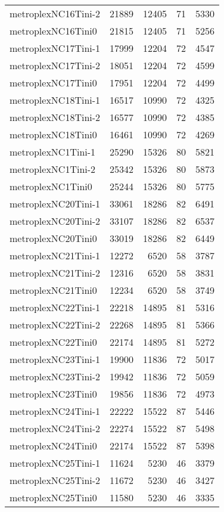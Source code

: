 \begin{longtable}{lrrrr}
metroplexNC16Tini-2 & 21889 & 12405 & 71 & 5330 \\
metroplexNC16Tini0 & 21815 & 12405 & 71 & 5256 \\
metroplexNC17Tini-1 & 17999 & 12204 & 72 & 4547 \\
metroplexNC17Tini-2 & 18051 & 12204 & 72 & 4599 \\
metroplexNC17Tini0 & 17951 & 12204 & 72 & 4499 \\
metroplexNC18Tini-1 & 16517 & 10990 & 72 & 4325 \\
metroplexNC18Tini-2 & 16577 & 10990 & 72 & 4385 \\
metroplexNC18Tini0 & 16461 & 10990 & 72 & 4269 \\
metroplexNC1Tini-1 & 25290 & 15326 & 80 & 5821 \\
metroplexNC1Tini-2 & 25342 & 15326 & 80 & 5873 \\
metroplexNC1Tini0 & 25244 & 15326 & 80 & 5775 \\
metroplexNC20Tini-1 & 33061 & 18286 & 82 & 6491 \\
metroplexNC20Tini-2 & 33107 & 18286 & 82 & 6537 \\
metroplexNC20Tini0 & 33019 & 18286 & 82 & 6449 \\
metroplexNC21Tini-1 & 12272 & 6520 & 58 & 3787 \\
metroplexNC21Tini-2 & 12316 & 6520 & 58 & 3831 \\
metroplexNC21Tini0 & 12234 & 6520 & 58 & 3749 \\
metroplexNC22Tini-1 & 22218 & 14895 & 81 & 5316 \\
metroplexNC22Tini-2 & 22268 & 14895 & 81 & 5366 \\
metroplexNC22Tini0 & 22174 & 14895 & 81 & 5272 \\
metroplexNC23Tini-1 & 19900 & 11836 & 72 & 5017 \\
metroplexNC23Tini-2 & 19942 & 11836 & 72 & 5059 \\
metroplexNC23Tini0 & 19856 & 11836 & 72 & 4973 \\
metroplexNC24Tini-1 & 22222 & 15522 & 87 & 5446 \\
metroplexNC24Tini-2 & 22274 & 15522 & 87 & 5498 \\
metroplexNC24Tini0 & 22174 & 15522 & 87 & 5398 \\
metroplexNC25Tini-1 & 11624 & 5230 & 46 & 3379 \\
metroplexNC25Tini-2 & 11672 & 5230 & 46 & 3427 \\
metroplexNC25Tini0 & 11580 & 5230 & 46 & 3335 \\

\end{longtable}
